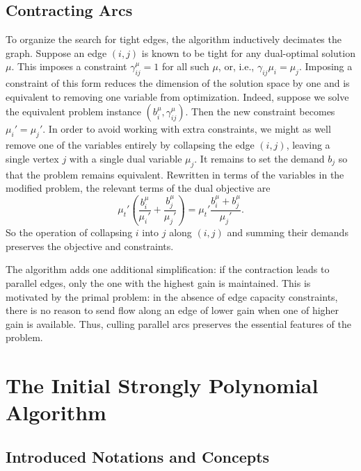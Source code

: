 \documentclass[12pt]{article}
\theoremstyle{definition}
\newcommand{\biu}{b_{i}^{\mu}}
\newcommand{\gij}{\gamma_{ij}}
\newcommand{\giij}{\gamma_{ij}^{\mu}}
\begin{document}
    \subsection{Contracting Arcs}
    To organize the search for tight edges, the algorithm inductively decimates the graph.
    Suppose an edge $(i, j)$ is known to be tight for any dual-optimal solution $\mu$. This
    imposes a constraint $\giij = 1$ for all such $\mu$, or, i.e., $\gij \mu_i = \mu_j$.
    Imposing a constraint of this form reduces the dimension of the solution
    space by one and is equivalent to removing one variable from optimization. Indeed,
    suppose we solve the equivalent problem instance $(\biu, \giij)$. Then the new constraint
    becomes $\mu_i' = \mu_j'$. In order to avoid working with extra constraints, we might
    as well remove one of the variables entirely by collapsing the edge $(i, j)$, leaving a single
    vertex $j$ with a single dual variable $\mu_j$. It remains to set the demand $b_j$ so
    that the problem remains equivalent. Rewritten in terms of the variables in
    the modified problem, the relevant terms of the dual objective are
    \[ \mu_t' \left(\frac{b_i^\mu}{\mu_i'} + \frac{b_j^\mu}{\mu_j'}\right)
     = \mu_t' \frac{b_i^\mu + b_j^\mu}{\mu_j'}. \]
	So the operation of collapsing $i$ into $j$ along $(i, j)$ and summing their demands
	preserves the objective and constraints.
	
	The algorithm adds one additional simplification: if the contraction leads to parallel edges,
	only the one with the highest gain is maintained. This is motivated by the primal problem: in
	the absence of edge capacity constraints, there is no reason to send flow along an edge of
	lower gain when one of higher gain is available. Thus, culling parallel arcs preserves the
	essential features of the problem.

\section{The Initial Strongly Polynomial Algorithm}
\subsection{Introduced Notations and Concepts}
\end{document}
